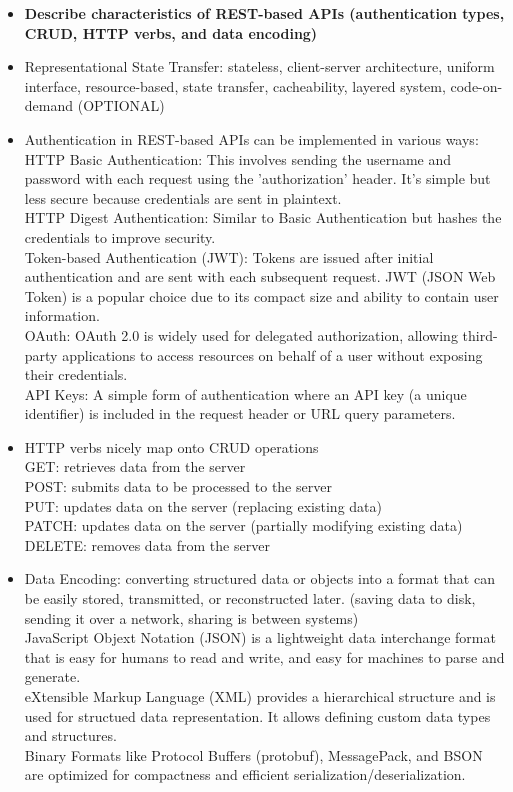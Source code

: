 \documentclass{article}
\begin{document}
\begin{itemize}
  \item \textbf{Describe characteristics of REST-based APIs (authentication types, CRUD, HTTP verbs, and data encoding)}
  	\item[] Representational State Transfer: stateless, client-server architecture, uniform interface, resource-based, state transfer, cacheability, layered system, code-on-demand (OPTIONAL)
  	\item[] Authentication in REST-based APIs can be implemented in various ways:\\
  		HTTP Basic Authentication: This involves sending the username and password with each request using the 'authorization' header. It's simple but less secure because credentials are sent in plaintext.\\
		HTTP Digest Authentication: Similar to Basic Authentication but hashes the credentials to improve security.\\
		Token-based Authentication (JWT): Tokens are issued after initial authentication and are sent with each subsequent request. JWT (JSON Web Token) is a popular choice due to its compact size and ability to contain user information.\\
		OAuth: OAuth 2.0 is widely used for delegated authorization, allowing third-party applications to access resources on behalf of a user without exposing their credentials.\\
		API Keys: A simple form of authentication where an API key (a unique identifier) is included in the request header or URL query parameters.
  	\item[] HTTP verbs nicely map onto CRUD operations\\
			GET: retrieves data from the server\\
			POST: submits data to be processed to the server\\
			PUT: updates data on the server (replacing existing data)\\
			PATCH: updates data on the server (partially modifying existing data)\\
			DELETE: removes data from the server
	\item[] Data Encoding: converting structured data or objects into a format that can be easily stored, transmitted, or reconstructed later. (saving data to disk, sending it over a network, sharing is between systems)\\
			JavaScript Objext Notation (JSON) is a lightweight data interchange format that is easy for humans to read and write, and easy for machines to parse and generate.\\
			eXtensible Markup Language (XML) provides a hierarchical structure and is used for structued data representation. It allows defining custom data types and structures.\\
			Binary Formats like Protocol Buffers (protobuf), MessagePack, and BSON are optimized for compactness and efficient serialization/deserialization.
  

\end{itemize}
\end{document}
